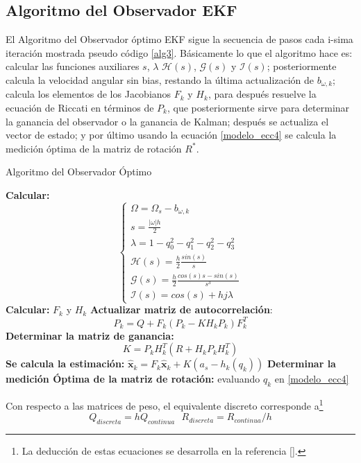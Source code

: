 \documentclass[10pt]{report}
\numberwithin{equation}{chapter}
\numberwithin{algorithm}{chapter}
\newcommand{\vect}[1]{\boldsymbol{#1}}
\newcommand{\estp}[1]{\hat{\boldsymbol{#1}}_k}
\begin{document}
\subsection{Algoritmo del Observador EKF }
El Algoritmo del Observador óptimo EKF sigue la secuencia de pasos cada i-sima iteración mostrada pseudo código \ref{alg3}. Básicamente lo que el algoritmo hace es: calcular las funciones auxiliares $s$, $\lambda$ $\mathcal{H}(s)$, $\mathcal{G}(s)$ y $\mathcal{I}(s)$; posteriormente calcula la velocidad angular sin bias, restando la última actualización de $b_{\omega,k}$; calcula los elementos de los Jacobianos $F_k$ y $H_k$, para después resuelve la ecuación de Riccati en términos de $P_k$, que posteriormente sirve para determinar la ganancia del observador o la ganancia de Kalman; después se actualiza el vector de estado; y por último usando la ecuación \eqref{modelo_ecc4} se calcula la medición óptima de la matriz de rotación $R^*$. 
\begin{algorithm}[h!]
\caption{Algoritmo del Observador Óptimo}
\label{alg3}
\begin{algorithmic}
\State\textbf{Calcular:}\begin{equation*}
\left\{
\begin{array}{c}
\Omega=\Omega_s-b_{\omega,k}\\
s=\frac{|\omega|h}{2}\\
\lambda=1-q_0^2-q_1^2-q_2^2-q_3^2\\
\mathcal{H}(s)=\frac{h}{2}\frac{sin(s)}{s}\\
\mathcal{G}(s)=\frac{h}{2}\frac{cos(s)s-sin(s)}{s^3}\\
\mathcal{I}(s)=cos(s)+hj\lambda
\end{array}\right.
\end{equation*}
\State \textbf{Calcular:} $F_k$ y $H_k$
\State\textbf{Actualizar matriz de autocorrelación}: $$P_k=Q+F_k(P_k-KH_kP_k)F_k^T$$
\State \textbf{Determinar la matriz de ganancia:}$$K=P_kH_k^T(R+H_kP_kH_k^T)$$
\State\textbf{Se calcula la estimación:}
\State $\estp{x} = F_k\hat{\vect{x}}_k+K(a_s-h_k(q_k))$
\State \textbf{Determinar la medición Óptima de la matriz de rotación:} evaluando $q_k$ en \eqref{modelo_ecc4}
\end{algorithmic}
\end{algorithm}\par
Con respecto a las matrices de peso, el equivalente discreto corresponde a\footnote{La deducción de estas ecuaciones se desarrolla en la referencia [\cite{Lewis2012}]. }
\begin{equation}\label{diseekf_ecc10}
Q_{discreta}=hQ_{continua}~~~R_{discreta}=R_{continua}/h
\end{equation}
\end{document}
